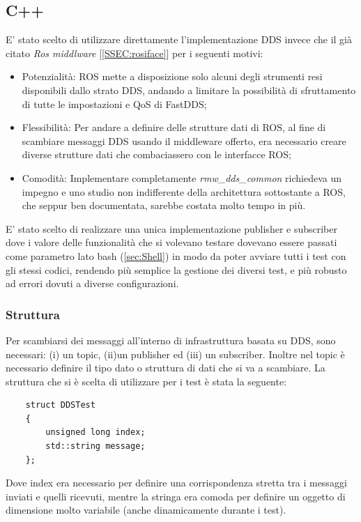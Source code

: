 \subsection{C++}
E' stato scelto di utilizzare direttamente l'implementazione DDS invece che il già citato \emph{Ros middlware} [\ref{SSEC:rosiface}] per i seguenti motivi:
\begin{itemize}
    \item Potenzialità: ROS mette a disposizione solo alcuni degli strumenti resi disponibili dallo strato DDS, andando a limitare la possibilità di sfruttamento di tutte le impostazioni e QoS di FastDDS;
    \item Flessibilità: Per andare a definire delle strutture dati di ROS, al fine di scambiare messaggi DDS usando il middleware offerto, era necessario creare diverse strutture dati che combaciassero con le interfacce ROS;
    \item Comodità: Implementare completamente \emph{rmw\_dds\_common} richiedeva un impegno e uno studio non indifferente della architettura sottostante a ROS, che seppur ben documentata, sarebbe costata molto tempo in più. 
\end{itemize}
E' stato scelto di realizzare una unica implementazione publisher e subscriber dove i valore delle funzionalità che si volevano testare dovevano essere passati come parametro lato bash (\ref{sec:Shell}) in modo da poter avviare tutti i test con gli stessi codici, rendendo più semplice la gestione dei diversi test, e più robusto ad errori dovuti a diverse configurazioni.
\subsubsection*{Struttura}

Per scambiarsi dei messaggi all'interno di infrastruttura basata su DDS, sono necessari: (i) un topic, (ii)un publisher ed (iii) un subscriber. Inoltre nel topic è necessario definire il tipo dato o struttura di dati che si va a scambiare. La struttura che si è scelta di utilizzare per i test è stata la seguente:
\begin{verbatim}
    struct DDSTest
    {
        unsigned long index;
        std::string message;
    };
\end{verbatim}
Dove index era necessario per definire una corrispondenza stretta tra i messaggi inviati e quelli ricevuti, mentre la stringa era comoda per definire un oggetto di dimensione molto variabile (anche dinamicamente durante i test).

